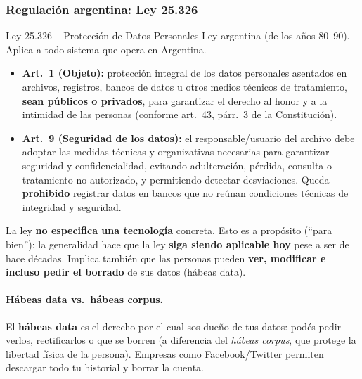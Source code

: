 \documentclass[../main.tex]{subfiles}
\begin{document}
\subsubsection{Regulación argentina: Ley 25.326}
\begin{definicion}{Ley 25.326 -- Protección de Datos Personales}
Ley argentina (de los años 80--90). Aplica a todo sistema que opera en Argentina.
\begin{itemize}[nosep]
  \item \textbf{Art.\ 1 (Objeto):} protección integral de los datos personales asentados
        en archivos, registros, bancos de datos u otros medios técnicos de tratamiento,
        \textbf{sean públicos o privados}, para garantizar el derecho al honor y a la
        intimidad de las personas (conforme art.\ 43, párr.\ 3 de la Constitución).
  \item \textbf{Art.\ 9 (Seguridad de los datos):} el responsable/usuario del archivo
        debe adoptar las medidas técnicas y organizativas necesarias para garantizar
        seguridad y confidencialidad, evitando adulteración, pérdida, consulta o
        tratamiento no autorizado, y permitiendo detectar desviaciones. Queda
        \textbf{prohibido} registrar datos en bancos que no reúnan condiciones técnicas
        de integridad y seguridad.
\end{itemize}
\end{definicion}

\begin{destacado}
La ley \textbf{no especifica una tecnología} concreta. Esto es a propósito (``para
bien''): la generalidad hace que la ley \textbf{siga siendo aplicable hoy} pese a ser
de hace décadas. Implica también que las personas pueden \textbf{ver, modificar e
incluso pedir el borrado} de sus datos (hábeas data).
\end{destacado}

\paragraph{Hábeas data vs.\ hábeas corpus.}
El \textbf{hábeas data} es el derecho por el cual sos dueño de tus datos: podés pedir
verlos, rectificarlos o que se borren (a diferencia del \emph{hábeas corpus}, que
protege la libertad física de la persona). Empresas como Facebook/Twitter permiten
descargar todo tu historial y borrar la cuenta.
\end{document}
